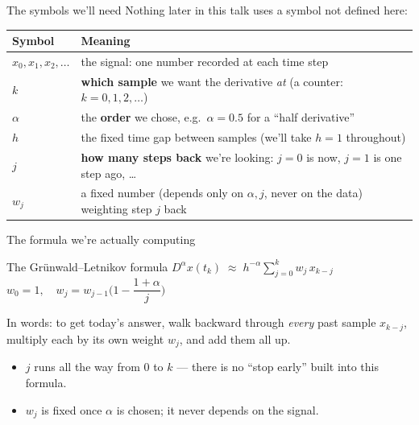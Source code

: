 \documentclass[11pt]{beamer}
\begin{document}
\begin{frame}{The symbols we'll need}
Nothing later in this talk uses a symbol not defined here:
\begin{center}
\small
\begin{tabularx}{\textwidth}{lX}
\toprule
Symbol & Meaning \\
\midrule
$x_0,x_1,x_2,\dots$ & the signal: one number recorded at each time step \\
$k$ & \textbf{which sample} we want the derivative \emph{at} (a counter: $k{=}0,1,2,\dots$) \\
$\alpha$ & the \textbf{order} we chose, e.g.\ $\alpha=0.5$ for a ``half derivative'' \\
$h$ & the fixed time gap between samples (we'll take $h=1$ throughout) \\
$j$ & \textbf{how many steps back} we're looking: $j{=}0$ is now, $j{=}1$ is one step ago, \dots \\
$w_j$ & a fixed number (depends only on $\alpha,j$, never on the data) weighting step $j$ back \\
\bottomrule
\end{tabularx}
\end{center}
\end{frame}

\begin{frame}{The formula we're actually computing}
\begin{block}{The Gr\"unwald--Letnikov formula}
\centering
$D^\alpha x(t_k) \;\approx\; h^{-\alpha}\displaystyle\sum_{j=0}^{k} w_j\, x_{k-j}$ \\[4pt]
$w_0=1, \quad w_j = w_{j-1}\Big(1-\dfrac{1+\alpha}{j}\Big)$
\end{block}
\vspace{0.5em}
In words: to get today's answer, walk backward through \emph{every} past sample $x_{k-j}$, multiply each by its own weight $w_j$, and add them all up.
\begin{itemize}
\item $j$ runs all the way from $0$ to $k$ --- there is no ``stop early'' built into this formula.
\item $w_j$ is fixed once $\alpha$ is chosen; it never depends on the signal.
\end{itemize}
\end{frame}
\end{document}
